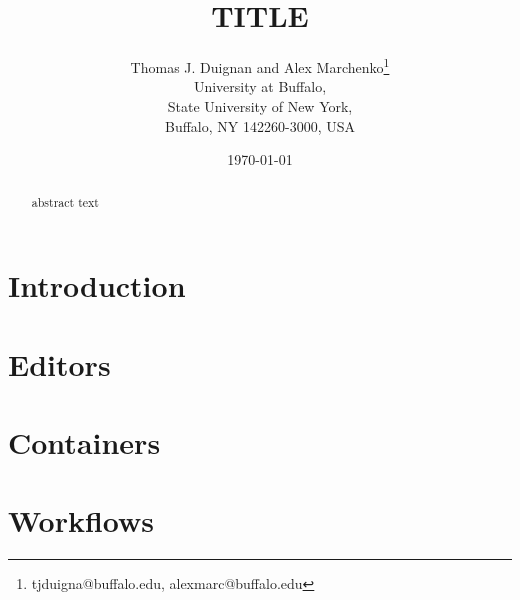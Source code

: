 \documentclass[12pt,letterpaper,oneside,twocolumn]{article}
\begin{document}
\title{TITLE}
\author{
	Thomas J. Duignan and Alex Marchenko\footnote{tjduigna@buffalo.edu, alexmarc@buffalo.edu} \\
	University at Buffalo, \\
	State University of New York, \\
	Buffalo, NY 142260-3000, USA \\
}
\date{\today}
\maketitle

\begin{abstract}
abstract text
\end{abstract}

\section*{Introduction}
\section*{Editors}
\section*{Containers}
\section*{Workflows}



\end{document}
